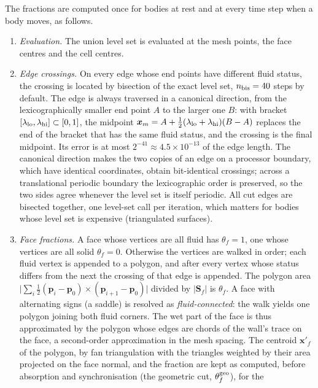 \documentclass[11pt,a4paper]{article}
\theoremstyle{remark}
\newcommand{\xx}{\bm{x}}
\newcommand{\Sf}{\bm{S}_f}
\begin{document}
The fractions are computed once for bodies at rest and at every time step when a body moves,
as follows.
\begin{enumerate}\itemsep3pt
\item \emph{Evaluation.} The union level set is evaluated at the mesh points, the face
      centres and the cell centres.
\item \emph{Edge crossings.} On every edge whose end points have different fluid status,
      the crossing is located by bisection of the exact level set, $n_{\rm bis}=40$ steps by
      default. The edge is always traversed in a canonical direction, from the
      lexicographically smaller end point $A$ to the larger one $B$: with bracket
      $[\lambda_{\rm lo},\lambda_{\rm hi}]\subset[0,1]$, the midpoint
      $\xx_m=A+\tfrac12(\lambda_{\rm lo}+\lambda_{\rm hi})(B-A)$ replaces the end of the
      bracket that has the same fluid status, and the crossing is the final midpoint. Its
      error is at most $2^{-41}\approx4.5\times10^{-13}$ of the edge length. The canonical
      direction makes the two copies of an edge on a processor boundary, which have identical
      coordinates, obtain bit-identical crossings; across a translational periodic boundary
      the lexicographic order is preserved, so the two sides agree whenever the level set
      is itself periodic. All cut edges are bisected together, one level-set call per
      iteration, which matters for bodies whose level set is expensive (triangulated
      surfaces).
\item \emph{Face fractions.} A face whose vertices are all fluid has $\theta_f=1$, one whose
      vertices are all solid $\theta_f=0$. Otherwise the vertices are walked in order;
      each fluid vertex is appended to a polygon, and after every vertex whose status differs
      from the next the crossing of that edge is appended. The polygon area
      $\big|\sum_i\tfrac12(\bm p_i-\bm p_0)\times(\bm p_{i+1}-\bm p_0)\big|$ divided by
      $|\Sf|$ is $\theta_f$. A face with alternating signs (a saddle) is resolved as
      \emph{fluid-connected}: the walk yields one polygon joining both fluid corners. The
      wet part of the face is thus approximated by the polygon whose edges are chords of the
      wall's trace on the face, a second-order approximation in the mesh spacing.
      The centroid $\xx'_f$ of the polygon, by fan triangulation with the triangles weighted
      by their area projected on the face normal, and the fraction are kept as computed,
      before absorption and synchronisation (the geometric cut, $\theta^{\rm geo}_f$), for the

\end{enumerate}
\end{document}
